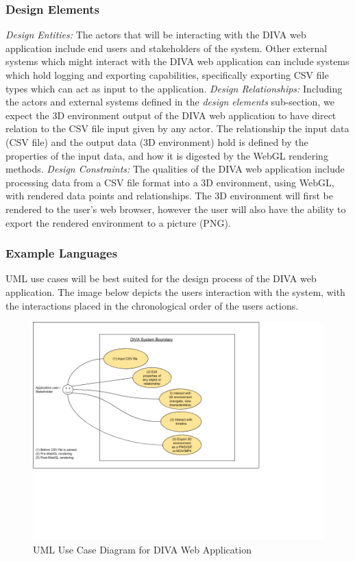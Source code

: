 \documentclass[journal,10pt,onecolumn,compsoc]{IEEEtran} \usepackage[margin=1.0in]{geometry} \usepackage{pdfpages}
\begin{document}
        \subsubsection{Design Elements}
        \textit{Design Entities: } The actors that will be interacting with the DIVA web application include end users and stakeholders of the system. Other external systems which might interact with the DIVA web application can include systems which hold logging and exporting capabilities, specifically exporting CSV file types which can act as input to the application.
        \textit{Design Relationships: } Including the actors and external systems defined in the \textit{design elements} sub-section, we expect the 3D environment output of the DIVA web application to have direct relation to the CSV file input given by any actor. The relationship the input data (CSV file) and the output data (3D environment) hold is defined by the properties of the input data, and how it is digested by the WebGL rendering methods.
        \textit{Design Constraints: } The qualities of the DIVA web application include processing data from a CSV file format into a 3D environment, using WebGL, with rendered data points and relationships. The 3D environment will first be rendered to the user's web browser, however the user will also have the ability to export the rendered environment to a picture (PNG).
        \subsubsection{Example Languages}
        UML use cases will be best suited for the design process of the DIVA web application. The image below depicts the users interaction with the system, with the interactions placed in the chronological order of the users actions. 
            \begin{figure}[H]
                \centering
                \includegraphics[width=\linewidth]{UML_1.png}
                \vspace{-4cm}
                \caption{UML Use Case Diagram for DIVA Web Application}
            \end{figure}
          
\end{document}
